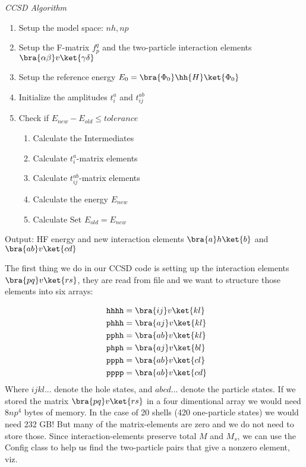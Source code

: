 \begin{algorithm}
\caption{\emph{CCSD Algorithm}}
\begin{enumerate}[1.]
\item Setup the model space: $nh,np$
\item Setup the F-matrix $f_p^q$ and the two-particle interaction elements $\bra{\alpha\beta}v\ket{\gamma\delta}$
\item Setup the reference energy $E_0 = \bra{\Phi_0}\hh{H}\ket{\Phi_0}$
\item Initialize the amplitudes $t_i^a$ and $t_{ij}^{ab}$
\item Check if $E_{new} - E_{old} \leq tolerance$
\begin{enumerate}[1.]
\item Calculate the Intermediates
\item Calculate $t_i^a$-matrix elements
\item Calculate $t_{ij}^{ab}$-matrix elements
\item Calculate the energy $E_{new}$
\item Calculate Set $E_{old} = E_{new}$
\end{enumerate}
\end{enumerate}
Output: HF energy and new interaction elements $\bra{a}h\ket{b}$ and $\bra{ab}v\ket{cd}$
\end{algorithm}
%
The first thing we do in our CCSD code is setting up the interaction elements $\bra{pq}v\ket{rs}$, they are read from file and we want to structure those elements into six arrays: 

 \begin{align*}  
\texttt{ hhhh}  &= \bra{ij}v\ket{kl} \\
\texttt{ phhh} &= \bra{aj}v\ket{kl} \\
\texttt{ pphh} &= \bra{ab}v\ket{kl} \\
\texttt{ phph} &= \bra{aj}v\ket{bl} \\
\texttt{ ppph} &= \bra{ab}v\ket{cl} \\
\texttt{ pppp} &= \bra{ab}v\ket{cd}
\end{align*}
%
Where $ijkl...$ denote the hole states, and $abcd...$ denote the particle states. If we stored the matrix $\bra{pq}v\ket{rs}$ in a four dimentional array we would need $8np^4$ bytes of memory. In the case of 20 shells (420 one-particle states) we would need 232 GB! But many of the matrix-elements are zero and we do not need to store those. Since interaction-elements preserve total $M$ and $M_s$, we can use the Config class to help us find the two-particle pairs that give a nonzero element, viz.
 

